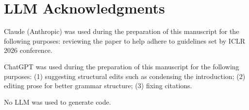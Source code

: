 \documentclass{article}
\begin{document}
\section*{LLM Acknowledgments}
Claude (Anthropic) was used during the preparation of this manuscript for the following purposes: reviewing the paper to help adhere to guidelines set by ICLR 2026 conference. 

ChatGPT was used during the preparation of this manuscript for the following purposes: (1) suggesting structural edits such as condensing the introduction; (2) editing prose for better grammar structure; (3) fixing citations.

No LLM was used to generate code.




\end{document}

